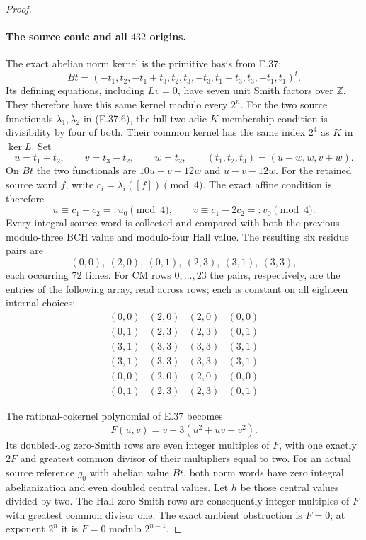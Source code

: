 \begin{proof}
\paragraph{The source conic and all $432$ origins.}
The exact abelian norm kernel is the primitive
basis from E.37:
\[
 Bt=(-t_1,t_2,-t_1+t_3,t_2,t_3,-t_3,
             t_1-t_3,t_3,-t_1,t_1)^t.
 \tag{E.41.13}
\]
Its defining equations, including $Lv=0$,
have seven unit Smith factors over $\mathbb Z$.
They therefore have this same kernel modulo
every $2^n$.
For the two source functionals $\lambda_1,\lambda_2$
in \textup{(E.37.6)}, the full two-adic
$K$-membership condition is divisibility by
four of both.  Their common kernel has the
same index $2^4$ as $K$ in $\ker L$.
Set
\[
 u=t_1+t_2,\qquad v=t_3-t_2,\qquad w=t_2,
 \qquad
 (t_1,t_2,t_3)=(u-w,w,v+w).
 \tag{E.41.14}
\]
On $Bt$ the two functionals are
$10u-v-12w$ and $u-v-12w$.
For the retained source word $f$, write
$c_i=\lambda_i([f])\pmod4$.
The exact affine condition is therefore
\[
        u\equiv c_1-c_2=:u_0\pmod4,\qquad
        v\equiv c_1-2c_2=:v_0\pmod4.
 \tag{E.41.15}
\]
Every integral source word is collected and
compared with both the previous modulo-three
BCH value and modulo-four Hall value.
The resulting six residue pairs are
\[
        (0,0),\ (2,0),\ (0,1),\
        (2,3),\ (3,1),\ (3,3),
 \tag{E.41.16}
\]
each occurring $72$ times.
For CM rows $0,\ldots,23$ the pairs, respectively,
are the entries of the following array, read
across rows; each is constant on all eighteen
internal choices:
\[
 \begin{array}{cccc}
 (0,0)&(2,0)&(2,0)&(0,0)\\
 (0,1)&(2,3)&(2,3)&(0,1)\\
 (3,1)&(3,3)&(3,3)&(3,1)\\
 (3,1)&(3,3)&(3,3)&(3,1)\\
 (0,0)&(2,0)&(2,0)&(0,0)\\
 (0,1)&(2,3)&(2,3)&(0,1)
 \end{array}
 \tag{E.41.17}
\]

The rational-cokernel polynomial of E.37 becomes
\[
                 F(u,v)=v+3(u^2+uv+v^2).
 \tag{E.41.18}
\]
Its doubled-log zero-Smith rows are even
integer multiples of $F$, with one exactly
$2F$ and greatest common divisor of their
multipliers equal to two.
For an actual source reference $g_0$ with
abelian value $Bt$, both norm words have
zero integral abelianization and even doubled
central values.  Let $h$ be those central
values divided by two.
The Hall zero-Smith rows are consequently
integer multiples of $F$ with greatest common
divisor one.  The exact ambient obstruction
is $F=0$; at exponent $2^n$ it is
$F=0$ modulo $2^{n-1}$.


\end{proof}
